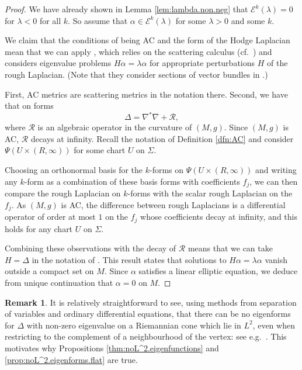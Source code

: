 \documentclass{article}
\theoremstyle{definition}
\newtheorem{rmk}[thm]{Remark}
\numberwithin{thm}{section}
\numberwithin{equation}{section}
\begin{document}
\begin{proof}
We have already shown in Lemma \ref{lem:lambda.non.neg} that $\mathcal{E}^k(\lambda)=0$ for $\lambda<0$ for all $k$.  So assume that $\alpha\in\mathcal{E}^k(\lambda)$ for some $\lambda>0$ and some $k$.

We claim that the conditions of being AC and the form of the Hodge Laplacian mean that we can apply \cite[Corollary 5.5]{CNTV}, which relies on the scattering calculus (cf.~\cite{Melrose}) and considers eigenvalue problems $H\alpha=\lambda\alpha$ for appropriate perturbations $H$ of the rough Laplacian.  (Note that they consider sections of vector bundles in \cite{CNTV}.) 

First,  AC metrics are scattering metrics in the notation there. Second, we have that on forms
    \begin{equation}
        \Delta=\nabla^*\nabla+\mathcal{R},
    \end{equation}
  where $\mathcal{R}$ is an algebraic operator in the curvature of $(M,g)$.  Since $(M,g)$ is AC, $\mathcal{R}$ decays at infinity.    Recall the notation of Definition \ref{dfn:AC} and consider $\Psi(U\times (R,\infty))$ for some chart $U$ on $\Sigma$.  
  
  Choosing an orthonormal basis for the $k$-forms on $\Psi(U\times (R,\infty))$  and writing any $k$-form as a combination of these basis forms with coefficients $f_j$, we can then compare the rough Laplacian on $k$-forms with the scalar rough Laplacian on the $f_j$.  As $(M,g)$ is AC, the difference between rough Laplacians is a differential operator of order at most $1$ on the $f_j$ whose coefficients decay at infinity, and this holds for any chart $U$ on $\Sigma$. 
  
  Combining these observations with the decay of $\mathcal{R}$ means that we can take $H=\Delta$ in the notation of \cite[Corollary 5.5]{CNTV}.    This result states that solutions to $H\alpha=\lambda\alpha$ vanish outside a compact set on $M$. %
  Since $\alpha$ satisfies a linear elliptic equation, we deduce from unique continuation that $\alpha=0$ on $M$. 
\end{proof}


\begin{rmk}
It is relatively straightforward to see, using methods from separation of variables and ordinary differential equations, that there can be no eigenforms for $\Delta$ with non-zero eigenvalue on a Riemannian cone which lie in $L^2$, even when restricting to the complement of a neighbourhood of the vertex: see e.g.~\cite{Cheeger}.  This motivates why Propositions \ref{thm:noL^2.eigenfunctions} and \ref{prop:noL^2.eigenforms.flat} are true.  
\end{rmk}
\end{document}
